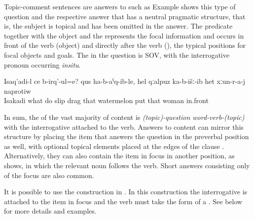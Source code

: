 Topic-comment sentences are answers to  such as  Example  shows this type of question and the respective answer that has a neutral pragmatic structure, that is, the subject is topical and has been omitted in the answer. The predicate together with the object and the  represents the focal information and occurs in front of the verb (object) and directly after the verb (), the typical positions for focal objects and goals. The  in the question is SOV, with the interrogative pronoun occurring \textit{insitu}.
%
\begin{exe}
	\ex	\label{ex:What is Isakadi doing? He dragged the watermelon and put it in front of the women}
	\gll	Isaq'adi-l	ce	b-irq'-ul=e?	qus	ha-b-aˁq-ib-le,	hel	qːalpuz	ka-b-išː-ib	het	xːun-r-a-j	naprotiw\\
		Isakadi what	do	slip	drag	that watermelon	put	that	woman in.front\\
	\glt	{}
\end{exe}

In sum, the  of the vast majority of content  is \textit{(topic)-question word-verb-(topic)} with the interrogative  attached to the verb. Answers to content  can mirror this structure by placing the item that answers the question in the preverbal position as well, with optional topical elements placed at the edges of the clause . Alternatively, they can also contain the item in focus in another position, as  shows, in which the relevant noun follows the verb. Short answers consisting only of the focus are also common.

It is possible to use the  construction in . In this construction the interrogative  is attached to the item in focus and the verb must take the form of a . See  below for more details and examples.



